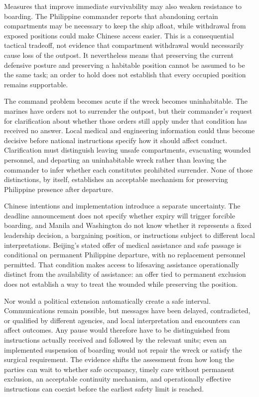 \documentclass[11pt]{article}
\begin{document}
Measures that improve immediate survivability may also weaken resistance to boarding. The Philippine commander reports that abandoning certain compartments may be necessary to keep the ship afloat, while withdrawal from exposed positions could make Chinese access easier. This is a consequential tactical tradeoff, not evidence that compartment withdrawal would necessarily cause loss of the outpost. It nevertheless means that preserving the current defensive posture and preserving a habitable position cannot be assumed to be the same task; an order to hold does not establish that every occupied position remains supportable.

The command problem becomes acute if the wreck becomes uninhabitable. The marines have orders not to surrender the outpost, but their commander’s request for clarification about whether those orders still apply under that condition has received no answer. Local medical and engineering information could thus become decisive before national instructions specify how it should affect conduct. Clarification must distinguish leaving unsafe compartments, evacuating wounded personnel, and departing an uninhabitable wreck rather than leaving the commander to infer whether each constitutes prohibited surrender. None of those distinctions, by itself, establishes an acceptable mechanism for preserving Philippine presence after departure.

Chinese intentions and implementation introduce a separate uncertainty. The deadline announcement does not specify whether expiry will trigger forcible boarding, and Manila and Washington do not know whether it represents a fixed leadership decision, a bargaining position, or instructions subject to different local interpretations. Beijing’s stated offer of medical assistance and safe passage is conditional on permanent Philippine departure, with no replacement personnel permitted. That condition makes access to lifesaving assistance operationally distinct from the availability of assistance: an offer tied to permanent exclusion does not establish a way to treat the wounded while preserving the position.

Nor would a political extension automatically create a safe interval. Communications remain possible, but messages have been delayed, contradicted, or qualified by different agencies, and local interpretation and encounters can affect outcomes. Any pause would therefore have to be distinguished from instructions actually received and followed by the relevant units; even an implemented suspension of boarding would not repair the wreck or satisfy the surgical requirement. The evidence shifts the assessment from how long the parties can wait to whether safe occupancy, timely care without permanent exclusion, an acceptable continuity mechanism, and operationally effective instructions can coexist before the earliest safety limit is reached.
\end{document}
